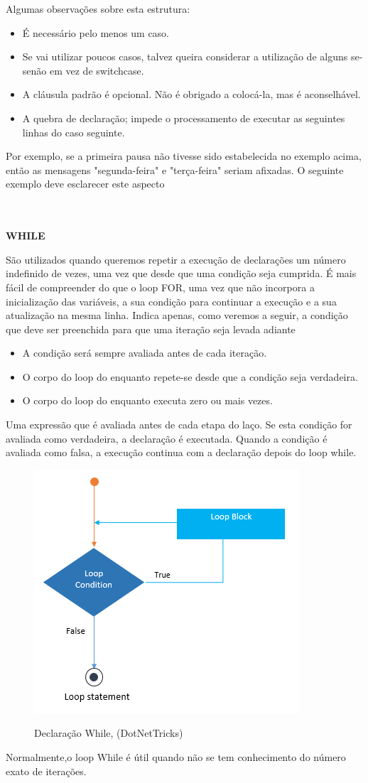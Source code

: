\documentclass[11pt, letterpaper, portuguese]{article}
\begin{document}
\par{Algumas observações sobre esta estrutura:
\begin{itemize}
\item  É necessário pelo menos um caso.
\item Se vai utilizar poucos casos, talvez queira considerar a utilização de alguns se-senão em vez de switchcase.
\item A cláusula padrão é opcional. Não é obrigado a colocá-la, mas é aconselhável.
\item A quebra de declaração; impede o processamento de executar as seguintes linhas do caso seguinte.
\end{itemize}
\par{Por exemplo, se a primeira pausa não tivesse sido estabelecida no exemplo acima, então as mensagens "segunda-feira" e "terça-feira" seriam afixadas. O seguinte exemplo deve esclarecer este aspecto}}\\ \\
\textbf{WHILE}
\par{São utilizados quando queremos repetir a execução de declarações um número indefinido de vezes, uma vez que desde que uma condição seja cumprida. É mais fácil de compreender do que o loop FOR, uma vez que não incorpora a inicialização das variáveis, a sua condição para continuar a execução e a sua atualização na mesma linha.
Indica apenas, como veremos a seguir, a condição que deve ser preenchida para que uma iteração seja levada adiante}\\
   \begin{itemize}
       \item A condição será sempre avaliada antes de cada iteração.
       \item O corpo do loop do enquanto repete-se desde que a condição seja verdadeira.
       \item O corpo do loop do enquanto executa zero ou mais vezes.
   \end{itemize}
   \par{Uma expressão que é avaliada antes de cada etapa do laço. Se esta condição for avaliada como verdadeira, a declaração é executada. Quando a condição é avaliada como falsa, a execução continua com a declaração depois do loop while.} \\
   
   \begin{figure}
	    \centering
		\caption{ Declaração While, ({DotNetTricks})}
		\includegraphics[width=0.2 \textwidth]{cloop.png}
		\label{Imagen_while}
	\end{figure}
	\par{Normalmente,o loop While é útil quando não se tem conhecimento do número exato de iterações.}\\
	
\end{document}
